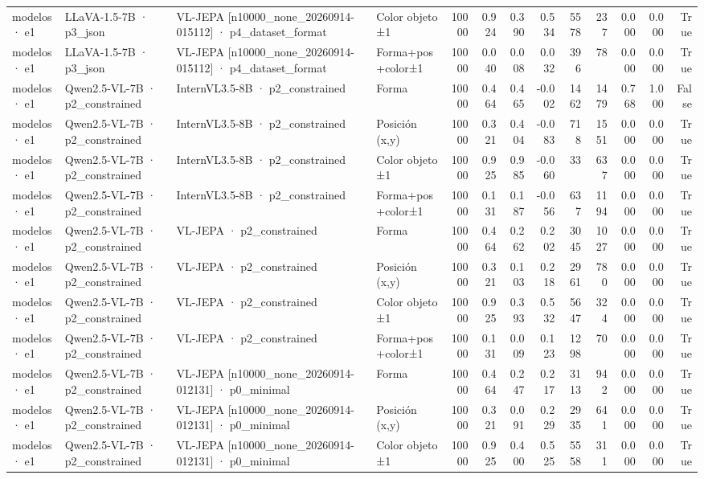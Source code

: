 \begin{tabular}{llllrrrrrrrrr}
modelos · e1 & LLaVA-1.5-7B · p3\_json & VL-JEPA [n10000\_none\_20260914-015112] · p4\_dataset\_format & Color objeto ±1 & 10000 & 0.924 & 0.390 & 0.534 & 5578 & 237 & 0.000 & 0.000 & True \\
modelos · e1 & LLaVA-1.5-7B · p3\_json & VL-JEPA [n10000\_none\_20260914-015112] · p4\_dataset\_format & Forma+pos+color±1 & 10000 & 0.040 & 0.008 & 0.032 & 396 & 78 & 0.000 & 0.000 & True \\
modelos · e1 & Qwen2.5-VL-7B · p2\_constrained & InternVL3.5-8B · p2\_constrained & Forma & 10000 & 0.464 & 0.465 & -0.002 & 1462 & 1479 & 0.768 & 1.000 & False \\
modelos · e1 & Qwen2.5-VL-7B · p2\_constrained & InternVL3.5-8B · p2\_constrained & Posición (x,y) & 10000 & 0.321 & 0.404 & -0.083 & 718 & 1551 & 0.000 & 0.000 & True \\
modelos · e1 & Qwen2.5-VL-7B · p2\_constrained & InternVL3.5-8B · p2\_constrained & Color objeto ±1 & 10000 & 0.925 & 0.985 & -0.060 & 33 & 637 & 0.000 & 0.000 & True \\
modelos · e1 & Qwen2.5-VL-7B · p2\_constrained & InternVL3.5-8B · p2\_constrained & Forma+pos+color±1 & 10000 & 0.131 & 0.187 & -0.056 & 637 & 1194 & 0.000 & 0.000 & True \\
modelos · e1 & Qwen2.5-VL-7B · p2\_constrained & VL-JEPA · p2\_constrained & Forma & 10000 & 0.464 & 0.262 & 0.202 & 3045 & 1027 & 0.000 & 0.000 & True \\
modelos · e1 & Qwen2.5-VL-7B · p2\_constrained & VL-JEPA · p2\_constrained & Posición (x,y) & 10000 & 0.321 & 0.103 & 0.218 & 2961 & 780 & 0.000 & 0.000 & True \\
modelos · e1 & Qwen2.5-VL-7B · p2\_constrained & VL-JEPA · p2\_constrained & Color objeto ±1 & 10000 & 0.925 & 0.393 & 0.532 & 5647 & 324 & 0.000 & 0.000 & True \\
modelos · e1 & Qwen2.5-VL-7B · p2\_constrained & VL-JEPA · p2\_constrained & Forma+pos+color±1 & 10000 & 0.131 & 0.009 & 0.123 & 1298 & 70 & 0.000 & 0.000 & True \\
modelos · e1 & Qwen2.5-VL-7B · p2\_constrained & VL-JEPA [n10000\_none\_20260914-012131] · p0\_minimal & Forma & 10000 & 0.464 & 0.247 & 0.217 & 3113 & 942 & 0.000 & 0.000 & True \\
modelos · e1 & Qwen2.5-VL-7B · p2\_constrained & VL-JEPA [n10000\_none\_20260914-012131] · p0\_minimal & Posición (x,y) & 10000 & 0.321 & 0.091 & 0.229 & 2935 & 641 & 0.000 & 0.000 & True \\
modelos · e1 & Qwen2.5-VL-7B · p2\_constrained & VL-JEPA [n10000\_none\_20260914-012131] · p0\_minimal & Color objeto ±1 & 10000 & 0.925 & 0.400 & 0.525 & 5558 & 311 & 0.000 & 0.000 & True \\

\end{tabular}
